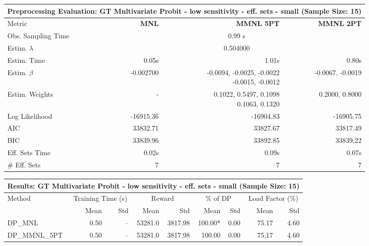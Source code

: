 
\begin{samepage}
\begin{center}
  \small
  \begin{tabular}{l|r|r|r}
    \toprule
    \multicolumn{4}{c}{\textbf{Preprocessing Evaluation: GT Multivariate Probit - low sensitivity - eff. sets - small (Sample Size: 15)}} \\
    \midrule
    Metric & \textbf{MNL} & \textbf{MMNL 5PT} & \textbf{MMNL 2PT} \\
    \midrule
    Obs. Sampling Time & \multicolumn{3}{c}{0.99 s} \\
    Estim. $\lambda$ & \multicolumn{3}{c}{0.504000} \\
    Estim. Time & 0.05s & 1.01s & 0.80s \\
    Estim. $\beta$ & -0.002700 & \makecell[tr]{-0.0094, -0.0025, -0.0022 \\ -0.0015, -0.0012} & -0.0067, -0.0019 \\
    Estim. Weights & - & \makecell[tr]{0.1022, 0.5497, 0.1098 \\ 0.1063, 0.1320} & 0.2000, 0.8000 \\
    Log Likelihood & -16915.36 & -16904.83 & -16905.75 \\
    AIC & 33832.71 & 33827.67 & 33817.49 \\
    BIC & 33839.96 & 33892.85 & 33839.22 \\
    Eff. Sets Time & 0.02s & 0.09s & 0.07s \\
    \# Eff. Sets & 7 & 7 & 7 \\
    \bottomrule
  \end{tabular}
\end{center}
\begin{center}
  \small
  \begin{tabular}{l|rr|rr|rr|rr}
    \toprule
    \multicolumn{9}{c}{\textbf{Results: GT Multivariate Probit - low sensitivity - eff. sets - small (Sample Size: 15)}} \\
    \midrule
    Method & \multicolumn{2}{c|}{Training Time (s)} & \multicolumn{2}{c|}{Reward} & \multicolumn{2}{c|}{\% of DP} & \multicolumn{2}{c}{Load Factor (\%)} \\
    & Mean & Std & Mean & Std & Mean & Std & Mean & Std \\
    \midrule
    DP\_MNL      &     0.50 &    -- &    53281.0 &    3817.98 & 100.00* &    0.00 &   75.17 &    4.60 \\
    DP\_MMNL\_5PT &     0.50 &    -- &    53281.0 &    3817.98 &  100.00 &    0.00 &   75.17 &    4.60 \\

\end{tabular}
\end{center}
\end{samepage}
